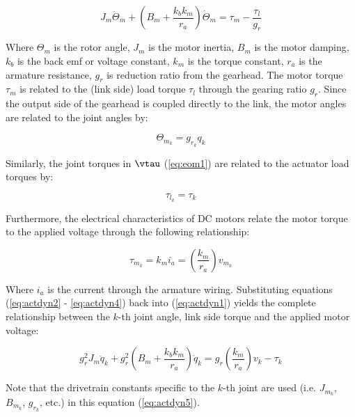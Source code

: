 \begin{equation}
	{J_m}{\ddot \Theta _m} + \left( {{B_m} + \frac{{{k_b}{k_m}}}{{{r_a}}}} \right)\dot \Theta _m  = {\tau _m} - \frac{{{\tau _l}}}{{{g_r}}}
	\label{eq:actdyn1}
\end{equation}

Where $\Theta _m$ is the rotor angle, $J_m$ is the motor inertia, $B_m$ is the motor damping, $k_b$ is the back emf or voltage constant, $k_m$ is the torque constant, $r_a$ is the armature resistance, $g_r$ is reduction ratio from the gearhead. The motor torque $\tau _m$ is related to the (link side) load torque $\tau _l$ through the gearing ratio $g_r$. Since the output side of the gearhead is coupled directly to the link, the motor angles are related to the joint angles by: 

\begin{equation}
	{\Theta _{m_k}} = {g _{r_k}} {q _k}
	\label{eq:actdyn2} 
\end{equation}

Similarly, the joint torques in $\vtau$ (\ref{eq:eom1}) are related to the actuator load torques by: 

\begin{equation}
	{\tau _{l_k}} = {\tau _k} 
	\label{eq:actdyn3}
\end{equation}

Furthermore, the electrical characteristics of DC motors relate the motor torque to the applied voltage through the following relationship: 

\begin{equation}
	{\tau _{m_k}} = {k_m} {i_a} = \left( {\frac{{{k_m}}}{{{r_a}}}} \right){v _{m_k}}
	\label{eq:actdyn4}
\end{equation}


Where $i_a$ is the current through the armature wiring. Substituting equations (\ref{eq:actdyn2} - \ref{eq:actdyn4}) back into (\ref{eq:actdyn1}) yields the complete relationship between the $k$-th joint angle, link side torque and the applied motor voltage:

\begin{equation}
	g_r^2{J_m}{\ddot q_k} + g_r^2\left( {{B_m} + \frac{{{k_b}{k_m}}}{{{r_a}}}} \right){\dot q_k} = g_r^{}\left( {\frac{{{k_m}}}{{{r_a}}}} \right){v_k} - {\tau _k}
	\label{eq:actdyn5}
\end{equation}

Note that the drivetrain constants specific to the $k$-th joint are used (i.e. ${J _{m_k}}$, ${B _{m_k}}$, $g _{r_k}$, etc.) in this equation (\ref{eq:actdyn5}). 

